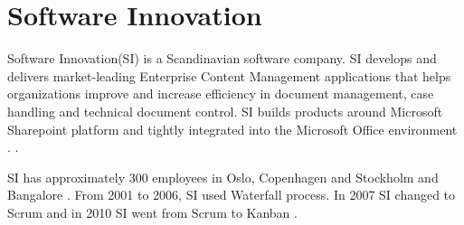 \documentclass[UKenglish]{ifimaster}  %
\begin{document}
\section{Software Innovation}
\label{sec:SI}
Software Innovation(SI) is a Scandinavian software company. SI develops and delivers market-leading Enterprise Content Management applications that helps organizations improve and increase efficiency in document management, case handling and technical document control. SI builds products around Microsoft Sharepoint platform and tightly integrated into the Microsoft Office environment \parencite{Dag}. \parencite{SI}.

SI has approximately 300 employees in Oslo, Copenhagen and Stockholm and Bangalore \parencite{SI}. From 2001 to 2006, SI used Waterfall process. In 2007 SI changed to Scrum and in 2010 SI went from Scrum to Kanban \parencite{Dag}.
\end{document}
